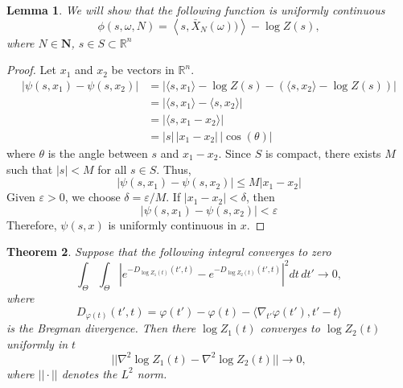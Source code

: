 \documentclass{article}
\theoremstyle{plain}
\newtheorem{theorem}{Theorem}[section]
\newtheorem{lemma}[theorem]{Lemma}
\theoremstyle{definition}
\theoremstyle{remark}
\begin{document}
\begin{lemma} 
We will show that the following function is uniformly continuous
\begin{equation}
    \phi(s, \omega, N) = \left\langle s, \bar{X}_N(\omega)) \right\rangle - \log Z(s),
\end{equation}
where $ N \in \mathbf{N} $, $ s \in S \subset \mathbb{R}^n $ \end{lemma}
\begin{proof}
    Let $x_1$ and $x_2$ be vectors in $\mathbb{R}^n$.
\begin{align*}
    |\psi(s, x_1) - \psi(s, x_2)| &= |\langle s, x_1 \rangle - \log Z(s) - (\langle s, x_2 \rangle - \log Z(s))| \\
    &= |\langle s, x_1 \rangle - \langle s, x_2 \rangle| \\
    &= |\langle s, x_1 - x_2 \rangle| \\
    &= |s| \, |x_1 - x_2| \, |\cos(\theta)|
\end{align*}
where $\theta$ is the angle between $s$ and $x_1 - x_2$. Since $S$ is compact, there exists $M$ such that $|s| < M$ for all $s \in S$.
Thus,
\[
|\psi(s, x_1) - \psi(s, x_2)| \leq M |x_1 - x_2|
\]
Given $\varepsilon > 0$, we choose $\delta = \varepsilon / M$. If $|x_1 - x_2| < \delta$, then $$|\psi(s, x_1) - \psi(s, x_2)| < \varepsilon$$ 
Therefore, $\psi(s,x)$ is uniformly continuous in $x$.
\end{proof}




\begin{theorem}
\label{theorem:convergence-appendix}
Suppose that the following integral converges to zero
\begin{equation}
\int_{\Theta} \int_{\Theta} \left| e^{-D_{\log Z_{1}(t)}(t',t)} - e^{-D_{\log Z_{2}(t)}(t',t)} \right|^{2} dt \, dt' \to 0,
\end{equation}
where 
$$
D_{\varphi(t)}(t',t) = \varphi(t') - \varphi(t) - \langle \nabla_{t'} \varphi(t'), t' - t \rangle
$$
is the Bregman divergence. Then there $\log Z_{1}(t)$ converges to $\log Z_{2}(t)$  uniformly in $t$
\begin{equation}
    || \nabla^{2}\log Z_{1}(t) - \nabla^{2}\log Z_{2}(t) || \to 0,
\end{equation}
where $||\cdot||$ denotes the $L^2$ norm.
\end{theorem}
\end{document}

